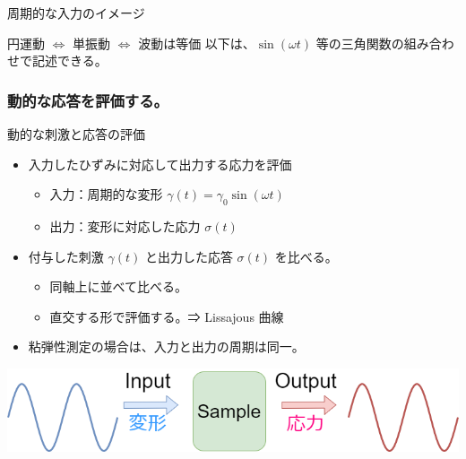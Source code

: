 \documentclass[unicode,12pt]{beamer}%
\begin{document}
\begin{frame}{周期的な入力のイメージ}
	\begin{exampleblock}{円運動 $\Leftrightarrow$ 単振動 $\Leftrightarrow$ 波動は等価}
		以下は、$\sin(\omega t)$ 等の三角関数の組み合わせで記述できる。

		\vspace{3mm}
		\centering
	\end{exampleblock}
\end{frame}

\begin{frame}
	\frametitle{動的な応答を評価する。}
		\begin{block}{動的な刺激と応答の評価}
			\begin{itemize}
				\item 入力したひずみに対応して出力する応力を評価
				\begin{itemize}
					\item 入力：周期的な変形 $\gamma(t) = \gamma_0 \sin(\omega t)$
					\item 出力：変形に対応した応力 $\sigma(t)$
				\end{itemize}
				\item 付与した刺激 $\gamma (t)$ と出力した応答 $\sigma (t)$ を比べる。
				\begin{itemize}
					\item 同軸上に並べて比べる。
					\item 直交する形で評価する。⇒ Lissajous 曲線
				\end{itemize}
				\item 粘弾性測定の場合は、入力と出力の周期は同一。
			\end{itemize}
		\end{block}
		\vspace{3mm}
		\centering
			\includegraphics[width=\textwidth]{dynamic_IO.png}
\end{frame}
\end{document}
